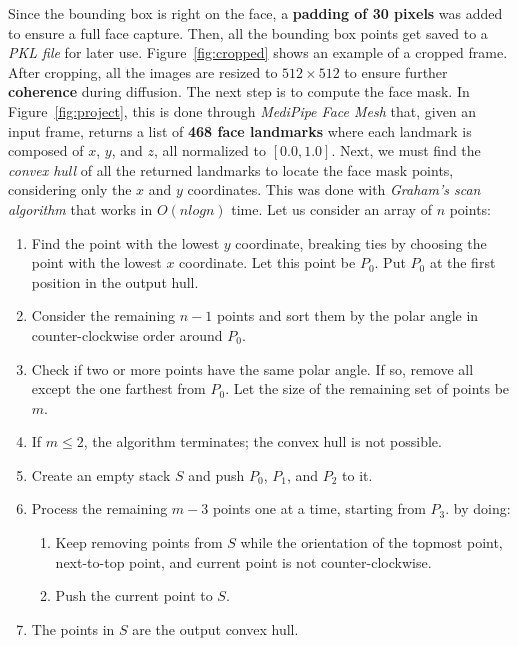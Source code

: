 \documentclass[sn-mathphys,Numbered]{sn-jnl}
\theoremstyle{thmstyleone}%
\theoremstyle{thmstyletwo}%
\theoremstyle{thmstylethree}%
\begin{document}
\FloatBarrier

Since the bounding box is right on the face, a \textbf{padding of 30 pixels} was added to ensure a full face capture. Then, all the bounding box points get saved to a \emph{PKL file} for later use.  Figure~\ref{fig:cropped} shows an example of a cropped frame. After cropping, all the images are resized to $512 \times 512$ to ensure further \textbf{coherence} during diffusion.  The next step is to compute the face mask.  In Figure~\ref{fig:project}, this is done through \emph{MediPipe Face Mesh} that, given an input frame, returns a list of \textbf{468 face landmarks}  where each landmark is composed of $x$, $y$, and $z$, all normalized to  $[0.0, 1.0]$.  Next, we must find the \emph{convex hull} of all the returned landmarks to locate the face mask points, considering only the $x$ and $y$ coordinates. 
This was done with \emph{Graham's scan algorithm} \cite{GRAHAM1972132} that works in $O(n log n)$ time. Let us consider an array of $n$ points:



\begin{enumerate}
	\item Find the point with the lowest $y$ coordinate, breaking ties by choosing the point with the lowest $x$ coordinate. 
	Let this point be $P_0$. Put $P_0$ at the first position in the output hull.
	\item Consider the remaining $n-1$ points and sort them by the polar angle in counter-clockwise order around $P_0$.
	\item Check if two or more points have the same polar angle. If so, remove all except the one farthest from $P_0$. 
	Let the size of the remaining set of points be $m$.
	\item If $m \leq 2$, the algorithm terminates; the convex hull is not possible.
	\item Create an empty stack $S$ and push $P_0$, $P_1$, and $P_2$ to it.
	\item Process the remaining $m-3$ points one at a time, starting from $P_3$. by doing:
	\begin{enumerate}
		\item Keep removing points from $S$ while the orientation of the topmost point, next-to-top point, and current point is not counter-clockwise.
		\item Push the current point to $S$.
	\end{enumerate}
	\item The points in $S$ are the output convex hull.
\end{enumerate}
\end{document}
